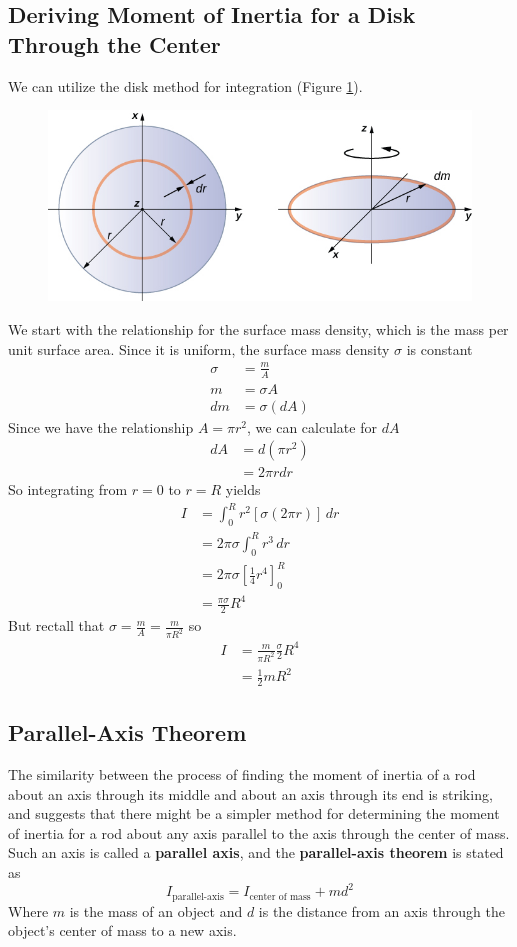 \subsection{Deriving Moment of Inertia for a Disk Through the Center}
We can utilize the disk method for integration (Figure \ref{fig:disk-moment-of-inertia}).
\begin{figure}[ht!]
    \centering
    \includegraphics[width=0.8 \textwidth]{../figures/disk moment of inertia.jpg}
    \caption{}
    \label{fig:disk-moment-of-inertia}
\end{figure}
We start with the relationship for the surface mass density, which is the mass per unit surface
area. Since it is uniform, the surface mass density $\sigma$ is constant
\begin{align*}
    \sigma&=\frac{m}{A}\\
    m&=\sigma A\\
   dm&=\sigma(dA)
\end{align*}
Since we have the relationship $A=\pi r^2$, we can calculate for $dA$
\begin{align*}
    dA&=d(\pi r^2)\\
    &=2\pi rdr
\end{align*}
So integrating from $r=0$ to $r=R$ yields
\begin{align*}
    I&=\int_0^Rr^2[\sigma(2\pi r)]\,dr\\
    &=2\pi\sigma\int_0^R r^3\,dr\\
    &=2\pi\sigma \left[\frac{1}{4}r^4\right]_0^R\\
    &=\frac{\pi\sigma}{2}R^4
\end{align*}
But rectall that $\sigma=\frac{m}{A}=\frac{m}{\pi R^2}$ so
\begin{align*}
    I&=\frac{m}{\pi R^2}\frac{\sigma}{2}R^4\\
    &=\frac{1}{2}mR^2
\end{align*}

\subsection{Parallel-Axis Theorem}
The similarity between the process of finding the moment of inertia of a rod about an axis through
its middle and about an axis through its end is striking, and suggests that there might be a simpler
method for determining the moment of inertia for a rod about any axis parallel to the axis through
the center of mass. Such an axis is called a \textbf{parallel axis}, and the \textbf{parallel-axis
theorem} is stated as
\[
    I_\text{parallel-axis}=I_\text{center of mass}+md^2
\]
Where $m$ is the mass of an object and $d$ is the distance from an axis through the object's 
center of mass to a new axis.

